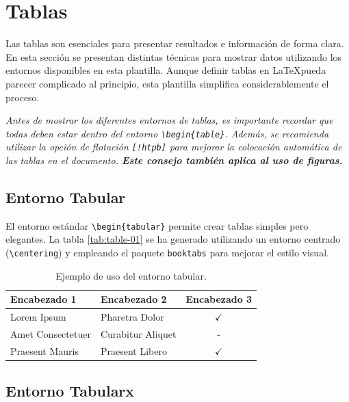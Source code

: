 \section{Tablas}

Las tablas son esenciales para presentar resultados e información de forma clara. En esta sección se presentan distintas técnicas para mostrar datos utilizando los entornos disponibles en esta plantilla. Aunque definir tablas en \LaTeX pueda parecer complicado al principio, esta plantilla simplifica considerablemente el proceso.

\begin{block}[tip]
\textit{Antes de mostrar los diferentes entornos de tablas, es importante recordar que todas deben estar dentro del entorno \texttt{\textbackslash begin\{table\}}. Además, se recomienda utilizar la opción de flotación \texttt{[!htpb]} para mejorar la colocación automática de las tablas en el documento. \textbf{Este consejo también aplica al uso de figuras.}}
\end{block}

\subsection{Entorno Tabular}

El entorno estándar \verb|\begin{tabular}| permite crear tablas simples pero elegantes. La tabla \autoref{tab:table-01} se ha generado utilizando un entorno centrado (\verb|\centering|) y empleando el paquete \verb|booktabs| para mejorar el estilo visual.

\begin{table}[!htpb]
    \caption{Ejemplo de uso del entorno tabular.}
    \label{tab:table-01}
    \centering
    \begin{tabular}{llc}
        \toprule
        \textbf{Encabezado 1} & \textbf{Encabezado 2} & \textbf{Encabezado 3} \\
        \midrule
        Lorem Ipsum         & Pharetra Dolor    & $\checkmark$  \\
        Amet Consectetuer   & Curabitur Aliquet & -             \\
        Praesent Mauris     & Praesent Libero   & $\checkmark$  \\
        \bottomrule
    \end{tabular}
\end{table}


\subsection{Entorno Tabularx}

